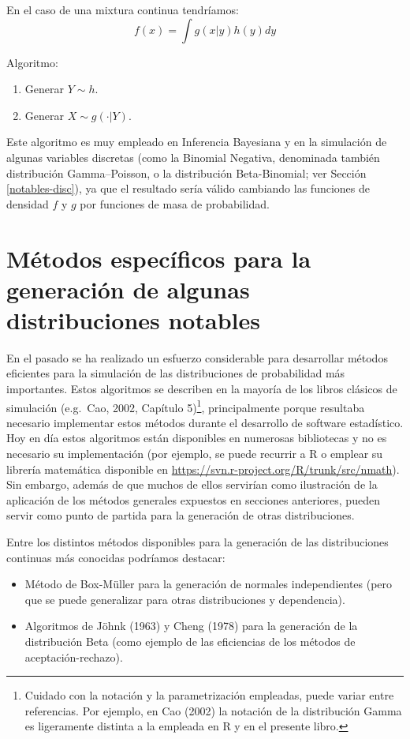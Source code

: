 \documentclass[
]{book}
\theoremstyle{break}
\theoremstyle{definition}
\theoremstyle{definition}
\theoremstyle{definition}
\theoremstyle{remark}
\begin{document}
En el caso de una mixtura continua tendríamos:
\[f(x)=\int g(x|y)h(y)dy\]

Algoritmo:

\begin{enumerate}
\def\labelenumi{\arabic{enumi}.}
\item
  Generar \(Y\sim h\).
\item
  Generar \(X\sim g(\cdot |Y)\).
\end{enumerate}

Este algoritmo es muy empleado en Inferencia Bayesiana y en la simulación de algunas variables discretas (como la Binomial Negativa, denominada también distribución Gamma--Poisson, o la distribución Beta-Binomial; ver Sección \ref{notables-disc}),
ya que el resultado sería válido cambiando las funciones de densidad \(f\) y \(g\) por funciones de masa de probabilidad.

\hypertarget{notables-cont}{%
\section{Métodos específicos para la generación de algunas distribuciones notables}\label{notables-cont}}

En el pasado se ha realizado un esfuerzo considerable para desarrollar métodos eficientes para la simulación de las distribuciones de probabilidad más importantes.
Estos algoritmos se describen en la mayoría de los libros clásicos de simulación (e.g.~Cao, 2002, Capítulo 5)\footnote{Cuidado con la notación y la parametrización empleadas, puede variar entre referencias. Por ejemplo, en Cao (2002) la notación de la distribución Gamma es ligeramente distinta a la empleada en R y en el presente libro.}, principalmente porque resultaba necesario implementar estos métodos durante el desarrollo de software estadístico.
Hoy en día estos algoritmos están disponibles en numerosas bibliotecas y no es necesario su implementación (por ejemplo, se puede recurrir a R o emplear su librería matemática disponible en \url{https://svn.r-project.org/R/trunk/src/nmath}).
Sin embargo, además de que muchos de ellos servirían como ilustración de la aplicación de los métodos generales expuestos en secciones anteriores, pueden servir como punto de partida para la generación de otras distribuciones.

Entre los distintos métodos disponibles para la generación de las distribuciones continuas más conocidas podríamos destacar:

\begin{itemize}
\item
  Método de Box-Müller para la generación de normales independientes (pero que se puede generalizar para otras distribuciones y dependencia).
\item
  Algoritmos de Jöhnk (1963) y Cheng (1978) para la generación de la distribución Beta (como ejemplo de las eficiencias de los métodos de aceptación-rechazo).
\end{itemize}
\end{document}
